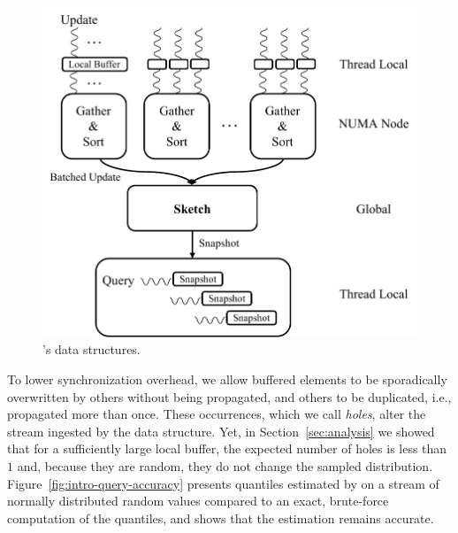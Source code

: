 \begin{figure}[htp]
    \centering
        \includegraphics[width=0.8\linewidth,trim={0cm 0cm 0cm 0.3cm},clip]{graphics/algorithm/Quancurrent_structure_intro.pdf}
    \caption{\mysketch's data structures.}
    \label{fig:quancurrentDS}
\end{figure}


To lower synchronization overhead, we allow buffered elements to be sporadically overwritten by others without being propagated, and others to be duplicated, i.e., propagated more than once. These occurrences, which we call \emph{holes}, alter the stream ingested by the data structure. 
Yet, in Section~\ref{sec:analysis} we showed that for a sufficiently large local buffer, the expected number of holes is less than $1$ and, because they are random, they do not change the sampled distribution.
Figure~\ref{fig:intro-query-accuracy} presents quantiles estimated by \mysketch on a stream of normally distributed random values compared to an exact, brute-force computation of the quantiles, and shows that the estimation remains accurate.

